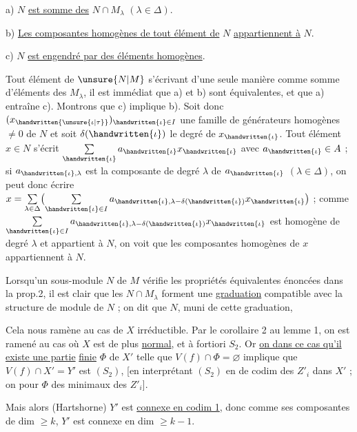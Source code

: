 a) $N$ \uline{est somme des} $N\cap M_\lambda$ $(\lambda\in\Delta)$.

b) \uline{Les composantes homogènes de tout élément de} $N$ \uline{appartiennent à} $N$.

c) $N$ \uline{est engendré par des éléments homogènes}.

Tout élément de $\unsure{N|M}$ s'écrivant d'une seule manière comme somme d'éléments des $M_\lambda$, il est immédiat que a) et b) sont équivalentes, et que a) entraîne c). Montrons que c) implique b). Soit donc $(x_{\handwritten{\unsure{\iota|\tau}}})_{\handwritten{\iota}\in I}$ une famille de générateurs homogènes $\ne 0$ de $N$ et soit $\delta(\handwritten{\iota})$ le degré de $x_{\handwritten{\iota}}$. Tout élément $x\in N$ s'écrit $\sum\limits_{\handwritten{\iota}}a_{\handwritten{\iota}}x_{\handwritten{\iota}}$ avec $a_{\handwritten{\iota}}\in A$ ; si $a_{\handwritten{\iota},\lambda}$ est la composante de degré $\lambda$ de $a_{\handwritten{\iota}}$ $(\lambda\in\Delta)$, on peut donc écrire $x=\sum\limits_{\lambda\in\Delta}\bigl(\sum\limits_{\handwritten{\iota}\in I}a_{\handwritten{\iota},\lambda-\delta(\handwritten{\iota})}x_{\handwritten{\iota}}\bigr)$ ; comme $\sum\limits_{\handwritten{\iota}\in I}a_{\handwritten{\iota},\lambda-\delta(\handwritten{\iota})}x_{\handwritten{\iota}}$ est homogène de degré $\lambda$ et appartient à $N$, on voit que les composantes homogènes de $x$ appartiennent à $N$.

Lorsqu'un sous-module $N$ de $M$ vérifie les propriétés équivalentes énoncées dans la prop.2, il est clair que les $N\cap M_\lambda$ forment une \uline{graduation} compatible avec la structure de module de $N$ ; on dit que $N$, muni de cette graduation,

Cela nous ramène au cas de $X$ irréductible. Par le corollaire 2 au lemme 1, on est ramené au cas où $X$ est de plus \uline{normal}, et à fortiori $S_2$. Or \uline{on  dans ce cas qu'il existe une partie} \uline{finie} $\Phi$ de $X'$ telle que $V(f)\cap\Phi=\varnothing$ implique que $V(f)\cap X'=Y'$ est $(S_2)$, [en interprétant $(S_2)$ en  de codim des $Z'_i$ dans $X'$ ; on  pour $\Phi$  des  minimaux des  $Z'_i$].

Mais alors (Hartshorne) $Y'$ est \uline{connexe en codim 1}, donc comme ses composantes  de dim $\geq k$, $Y'$ est connexe en dim $\geq k-1$.

